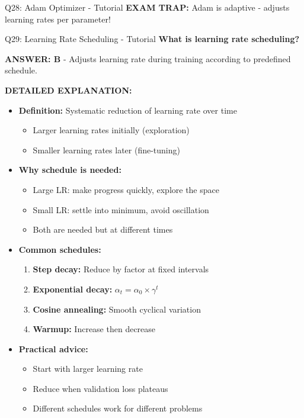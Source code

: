 \documentclass[8pt]{beamer}
\begin{document}
\begin{frame}{Q28: Adam Optimizer - Tutorial}
		\textcolor{myred}{\textbf{EXAM TRAP:}} Adam is \textcolor{myblue}{adaptive} - adjusts learning rates per parameter!
	\end{frame}
	
	\begin{frame}{Q29: Learning Rate Scheduling - Tutorial}
		\fontsize{6.5}{7.5}\selectfont
		\textbf{What is learning rate scheduling?}
		
		\vspace{0.05cm}
		\textcolor{myblue}{\textbf{ANSWER: B}} - Adjusts learning rate during training according to predefined schedule.
		
		\vspace{0.05cm}
		\textbf{DETAILED EXPLANATION:}
		\begin{itemize}
			\item \textbf{Definition:} Systematic reduction of learning rate over time
			\begin{itemize}
				\item Larger learning rates initially (exploration)
				\item Smaller learning rates later (fine-tuning)
			\end{itemize}
			\item \textbf{Why schedule is needed:}
			\begin{itemize}
				\item Large LR: make progress quickly, explore the space
				\item Small LR: settle into minimum, avoid oscillation
				\item Both are needed but at different times
			\end{itemize}
			\item \textbf{Common schedules:}
			\begin{enumerate}
				\item \textbf{Step decay:} Reduce by factor at fixed intervals
				\item \textbf{Exponential decay:} $\alpha_t = \alpha_0 \times \gamma^t$
				\item \textbf{Cosine annealing:} Smooth cyclical variation
				\item \textbf{Warmup:} Increase then decrease
			\end{enumerate}
			\item \textbf{Practical advice:}
			\begin{itemize}
				\item Start with larger learning rate
				\item Reduce when validation loss plateaus
				\item Different schedules work for different problems
			\end{itemize}
		\end{itemize}
		

\end{frame}
\end{document}
